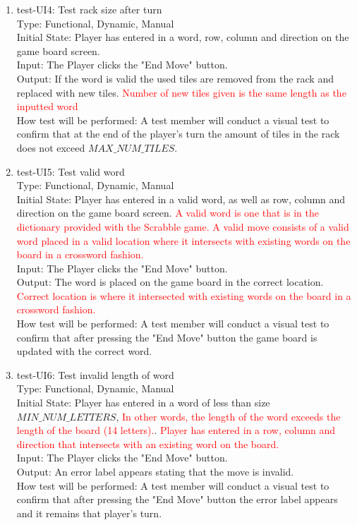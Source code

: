 \documentclass[12pt, titlepage]{article}
\begin{document}
\begin{enumerate}
    \item{test-UI4: Test rack size after turn\\} %
    Type: Functional, Dynamic, Manual\\
    Initial State: Player has entered in a word, row, column and direction on the game board screen.\\
    Input: The Player clicks the "End Move" button.\\
    Output: If the word is valid the used tiles are removed from the rack and replaced with new tiles. \textcolor{red}{Number of new tiles given is the same length as the inputted word}\\
    How test will be performed: A test member will conduct a visual test to confirm that at the end of the player's turn the amount of tiles in the rack does not exceed $MAX\_NUM\_TILES$.
    
    \item{test-UI5: Test valid word\\} %
    Type: Functional, Dynamic, Manual\\
    Initial State: Player has entered in a valid word, as well as row, column and direction on the game board screen. \textcolor{red}{A valid word is one that is in the dictionary provided with the Scrabble game. A valid move consists of a valid word placed in a valid location where it intersects with existing words on the board in a crossword fashion.}\\
    Input: The Player clicks the "End Move" button.\\
    Output: The word is placed on the game board in the correct location. \textcolor{red}{Correct location is where it intersected with existing words on the board in a crossword fashion.}\\
    How test will be performed: A test member will conduct a visual test to confirm that after pressing the "End Move" button the game board is updated with the correct word.\\ 
    
    \item{test-UI6: Test invalid length of word \\} %
    Type: Functional, Dynamic, Manual\\
    Initial State: Player has entered in a word of less than size $MIN\_NUM\_LETTERS$, \textcolor{red}{In other words, the length of the word exceeds the length of the board (14 letters).}. \textcolor{red}{Player has entered in a row, column and direction that intersects with an existing word on the board.} \\
    Input: The Player clicks the "End Move" button.\\
    Output: An error label appears stating that the move is invalid.\\
    How test will be performed: A test member will conduct a visual test to confirm that after pressing the "End Move" button the error label appears and it remains that player's turn.\\
    

\end{enumerate}
\end{document}

